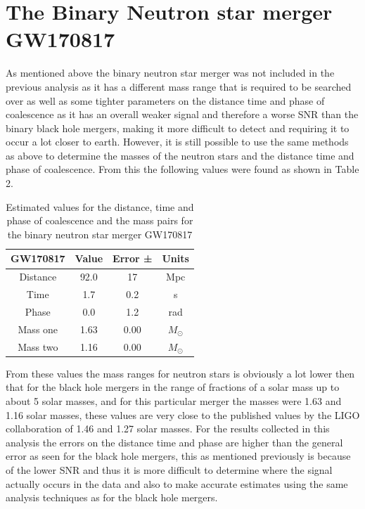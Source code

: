 \documentclass[]{article}
\begin{document}
\section*{The Binary Neutron star \newline merger GW170817}
As mentioned above the binary neutron star \newline merger was not included in the previous analysis as it has a different mass range that is required to be
searched over as well as some tighter parameters on the distance time and phase of coalescence as it has an overall weaker signal and therefore
a worse SNR than the binary black hole mergers, making it more difficult to detect and requiring it to occur a lot closer to earth.
However, it is still possible to use the same methods as above to determine the masses of the neutron stars and the distance time and phase of coalescence.
From this the following values were found as shown in Table 2.
\begin{table}[h]
    \begin{center}
        \begin{tabular}{|c c c c|}
            \hline
            GW170817 & Value & Error ±& Units\\
            \hline
            Distance & 92.0 & 17 & Mpc\\
            Time & 1.7 & 0.2 & s\\
            Phase & 0.0 & 1.2 & rad\\
            Mass one & 1.63 & 0.00 & $M_{\odot}$\\
            Mass two & 1.16 & 0.00 & $M_{\odot}$\\
            \hline
        \end{tabular}
        \caption{Estimated values for the distance, time and phase of coalescence and the mass pairs for the binary neutron star merger GW170817}
        \label{tab:estimates}
    \end{center}
\end{table}

From these values the mass ranges for neutron stars is obviously a lot lower then that for the
black hole mergers in the range of fractions of a solar mass up to about 5 solar masses,
and for this particular merger the masses were 1.63 and 1.16 solar masses, these values are very close to the
published values by the LIGO collaboration of 1.46 and 1.27 solar masses. For the results collected
in this analysis the errors on the distance time and phase are higher than the general error as seen for the
black hole mergers, this as mentioned previously is because of the lower SNR and thus
it is more difficult to determine where the signal actually occurs in the data
and also to make accurate estimates using the same analysis techniques as
for the black hole mergers.
\end{document}
